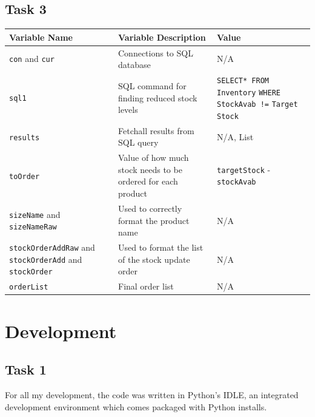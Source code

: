 \documentclass[a4paper]{article}
\begin{document}
\subsection{Task 3}
\begin{center}
\begin{tabular}{ | m{13em} | m{16em}| m{14em} | } 
  \hline
  Variable Name & Variable Description & Value \\ [0.5ex] 
  \hline\hline
  \verb|con| and \verb|cur| & Connections to SQL database & N/A \\
  \hline
  \verb|sql1| & SQL command for finding reduced stock levels & \verb|SELECT* FROM Inventory| \verb|WHERE StockAvab !=| \verb|Target Stock| \\
  \hline
  \verb|results| & Fetchall results from SQL query & N/A, List	\\
  \hline
  \verb|toOrder| & Value of how much stock needs to be ordered for each product & \verb|targetStock| - \verb|stockAvab| \\
  \hline
  \verb|sizeName| and \verb|sizeNameRaw| & Used to correctly format the product name & N/A \\
  \hline
  \verb|stockOrderAddRaw| and \verb|stockOrderAdd| and \verb|stockOrder| & Used to format the list of the stock update order & N/A \\
  \hline
  \verb|orderList| & Final order list & N/A \\
  \hline
  \end{tabular}
\end{center}


\section{Development}
\subsection{Task 1}
For all my development, the code was written in Python's IDLE, an integrated development environment which comes packaged with Python installs.
\end{document}
